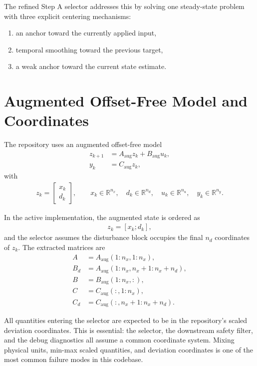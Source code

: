 \documentclass[11pt]{article}
\begin{document}
The refined Step A selector addresses this by solving one steady-state problem with three explicit centering mechanisms:
\begin{enumerate}[label=\alph*)]
\item an anchor toward the currently applied input,
\item temporal smoothing toward the previous target,
\item a weak anchor toward the current state estimate.
\end{enumerate}

\section{Augmented Offset-Free Model and Coordinates}
The repository uses an augmented offset-free model
\begin{align}
z_{k+1} &= A_{\mathrm{aug}} z_k + B_{\mathrm{aug}} u_k, \\
y_k &= C_{\mathrm{aug}} z_k,
\end{align}
with
\begin{align}
z_k = \begin{bmatrix} x_k \\ d_k \end{bmatrix},
\qquad
x_k \in \mathbb{R}^{n_x},
\quad
d_k \in \mathbb{R}^{n_d},
\quad
u_k \in \mathbb{R}^{n_u},
\quad
y_k \in \mathbb{R}^{n_y}.
\end{align}

In the active implementation, the augmented state is ordered as
\begin{align}
z_k = [x_k; d_k],
\end{align}
and the selector assumes the disturbance block occupies the final $n_d$ coordinates of $z_k$. The extracted matrices are
\begin{align}
A &= A_{\mathrm{aug}}(1\!:\!n_x,1\!:\!n_x), \\
B_d &= A_{\mathrm{aug}}(1\!:\!n_x,n_x\!+\!1\!:\!n_x\!+\!n_d), \\
B &= B_{\mathrm{aug}}(1\!:\!n_x,:), \\
C &= C_{\mathrm{aug}}(:,1\!:\!n_x), \\
C_d &= C_{\mathrm{aug}}(:,n_x\!+\!1\!:\!n_x\!+\!n_d).
\end{align}

All quantities entering the selector are expected to be in the repository's scaled deviation coordinates. This is essential: the selector, the downstream safety filter, and the debug diagnostics all assume a common coordinate system. Mixing physical units, min-max scaled quantities, and deviation coordinates is one of the most common failure modes in this codebase.
\end{document}
